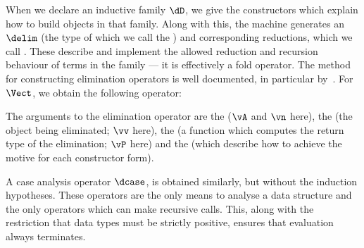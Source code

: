 \label{elimops}

When we declare an inductive family $\dD$, we give the constructors
which explain how to build objects in that family. Along with this,
the machine generates an  $\delim$ (the
type of which we call the ) and corresponding
reductions, which we call
. These
describe and implement the allowed reduction and recursion behaviour
of terms in the family --- it is effectively a fold operator.  The
method for constructing elimination operators is well documented, in
particular by~\cite{dybjer94,luo94,mcbride-thesis}.
For $\Vect$, we obtain the following operator:


The arguments to the elimination operator are the  ($\vA$
and $\vn$ here), the  (the object being eliminated;
$\vv$ here), the  (a function which computes the return
type of the elimination; $\vP$ here) and the 
(which describe how to achieve the motive for each constructor form).

A case analysis operator $\dcase$, is obtained similarly, but without
the induction hypotheses. These operators are the only means to
analyse a data structure and the only operators which can make
recursive calls. This, along with the restriction that data types must
be strictly positive, ensures that evaluation always terminates.

